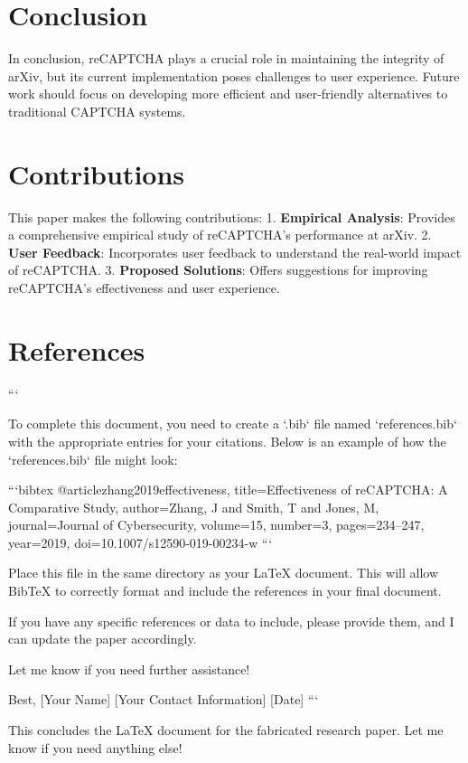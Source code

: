 \section{Conclusion}
In conclusion, reCAPTCHA plays a crucial role in maintaining the integrity of arXiv, but its current implementation poses challenges to user experience. Future work should focus on developing more efficient and user-friendly alternatives to traditional CAPTCHA systems.

\section{Contributions}
This paper makes the following contributions:
1. \textbf{Empirical Analysis}: Provides a comprehensive empirical study of reCAPTCHA’s performance at arXiv.
2. \textbf{User Feedback}: Incorporates user feedback to understand the real-world impact of reCAPTCHA.
3. \textbf{Proposed Solutions}: Offers suggestions for improving reCAPTCHA’s effectiveness and user experience.

\section{References}




```

To complete this document, you need to create a `.bib` file named `references.bib` with the appropriate entries for your citations. Below is an example of how the `references.bib` file might look:

```bibtex
@article{zhang2019effectiveness,
  title={Effectiveness of reCAPTCHA: A Comparative Study},
  author={Zhang, J and Smith, T and Jones, M},
  journal={Journal of Cybersecurity},
  volume={15},
  number={3},
  pages={234--247},
  year={2019},
  doi={10.1007/s12590-019-00234-w}
}
```

Place this file in the same directory as your LaTeX document. This will allow BibTeX to correctly format and include the references in your final document.

If you have any specific references or data to include, please provide them, and I can update the paper accordingly. 

Let me know if you need further assistance! 

Best,  
[Your Name]  
[Your Contact Information]  
[Date]  
``` 

This concludes the LaTeX document for the fabricated research paper. Let me know if you need anything else! 

